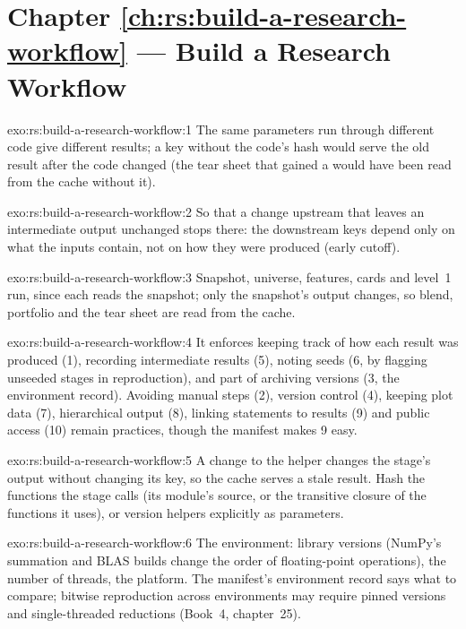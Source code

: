 \section*{Chapter \ref{ch:rs:build-a-research-workflow} --- Build a Research Workflow}

\begin{solution}{exo:rs:build-a-research-workflow:1}
The same parameters run through different code give different results; a key without the code's hash would serve the old result after the code changed (the
tear sheet that gained a  would have been read from the cache without it).
\end{solution}

\begin{solution}{exo:rs:build-a-research-workflow:2}
So that a change upstream that leaves an intermediate output unchanged stops there: the downstream keys depend only on what the inputs contain, not on how they
were produced (early cutoff).
\end{solution}

\begin{solution}{exo:rs:build-a-research-workflow:3}
Snapshot, universe, features, cards and level~1 run, since each reads the snapshot; only the snapshot's output changes, so blend, portfolio and the tear sheet
are read from the cache.
\end{solution}

\begin{solution}{exo:rs:build-a-research-workflow:4}
It enforces keeping track of how each result was produced (1), recording intermediate results (5), noting seeds (6, by flagging unseeded stages in
reproduction), and part of archiving versions (3, the environment record). Avoiding manual steps (2), version control (4), keeping plot data (7), hierarchical
output (8), linking statements to results (9) and public access (10) remain practices, though the manifest makes 9 easy.
\end{solution}

\begin{solution}{exo:rs:build-a-research-workflow:5}
A change to the helper changes the stage's output without changing its key, so the cache serves a stale result. Hash the functions the stage calls (its
module's source, or the transitive closure of the functions it uses), or version helpers explicitly as parameters.
\end{solution}

\begin{solution}{exo:rs:build-a-research-workflow:6}
The environment: library versions (NumPy's summation and BLAS builds change the order of floating-point operations), the number of threads, the platform. The
manifest's environment record says what to compare; bitwise reproduction across environments may require pinned versions and single-threaded reductions (Book~4,
chapter~25).
\end{solution}

